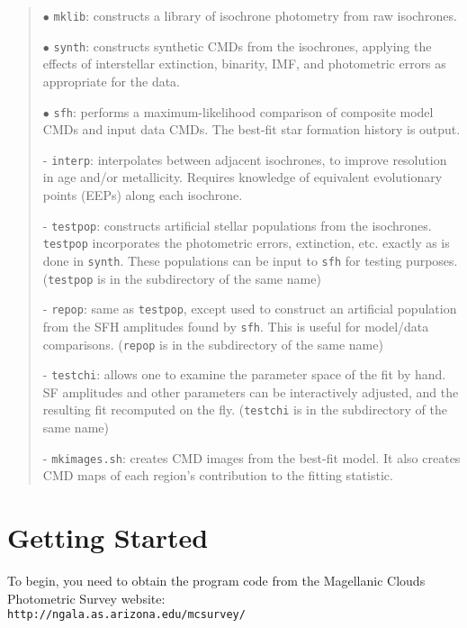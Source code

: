 \documentclass[12pt]{book}
\def\ttg{\tt\color{DarkGreen}}
\def\ttb{\tt\color{myBlue}}
\begin{document}
\begin{quote}
\bigskip\noindent
$\bullet$ {\ttg mklib}: constructs a library of isochrone 
photometry from raw isochrones.

\medskip\noindent
$\bullet$ {\ttg synth}: constructs synthetic CMDs 
from the isochrones, applying the effects of interstellar extinction, 
binarity, IMF, and photometric errors as appropriate for the data.

\medskip\noindent
$\bullet$ {\ttg sfh}:   performs a 
maximum-likelihood comparison of composite model CMDs and input data 
CMDs.  The best-fit star formation history is output. 


\bigskip\noindent
- {\ttg interp}:  interpolates between adjacent 
isochrones, to improve resolution in age and/or metallicity.  Requires 
knowledge of equivalent evolutionary points (EEPs) along each 
isochrone. 
   
\medskip\noindent
- {\ttg testpop}: constructs artificial stellar 
populations from the isochrones.  {\ttg testpop} 
incorporates the photometric errors, extinction, etc. exactly as is 
done in {\ttg synth}.  These populations can be 
input to {\ttg sfh} for testing purposes.  
({\ttg testpop} is in the subdirectory of the same 
name)

\medskip\noindent
- {\ttg repop}: same as {\ttg testpop}, except used to construct an 
artificial population from the SFH amplitudes found by {\ttg sfh}.  
This is useful for model/data comparisons. ({\ttg repop} is in the 
subdirectory of the same name)

\medskip\noindent
- {\ttg testchi}: allows one to examine the parameter space of the 
fit by hand.  SF amplitudes and other parameters can be interactively 
adjusted, and the resulting fit recomputed on the fly. ({\ttg testchi} 
is in the subdirectory of the same name) 

\medskip\noindent
- {\ttg mkimages.sh}: creates CMD images from the best-fit model.  It 
also creates CMD maps of each region's contribution to the fitting 
statistic. 
\end{quote}

\clearpage

\section{Getting Started}

To begin, you need to obtain the program code from the Magellanic 
Clouds Photometric Survey website: \\
{\ttb http://ngala.as.arizona.edu/mcsurvey/}
\end{document}
